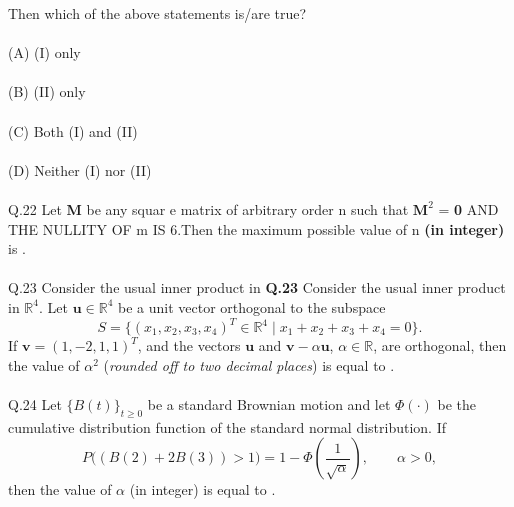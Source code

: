 \documentclass{book}[200pt]
\begin{document}
{Then which of the above statements is/are true?\\
\\
(A) (I) only \\
\\
(B) (II) only \\
\\
(C) Both (I) and (II)\\
\\
(D) Neither (I) nor (II)\\
\\
Q.22 Let \textbf{M} be any squar e matrix of arbitrary order n such that $\textbf{M}^2$  = \textbf{0} AND THE NULLITY OF m IS 6.Then the maximum possible value of n \textbf{(in integer)} is \underline{\hspace{2cm}}.\\
\\
Q.23 Consider the usual inner product in \textbf{Q.23} Consider the usual inner product in $\mathbb{R}^4$. 
Let $\mathbf{u} \in \mathbb{R}^4$ be a unit vector orthogonal to the subspace
\[
S = \{ (x_1, x_2, x_3, x_4)^T \in \mathbb{R}^4 
\mid x_1 + x_2 + x_3 + x_4 = 0 \}.
\]
If $\mathbf{v} = (1, -2, 1, 1)^T$, and the vectors $\mathbf{u}$ and 
$\mathbf{v} - \alpha \mathbf{u}$, $\alpha \in \mathbb{R}$, are orthogonal, 
then the value of $\alpha^2$ (\textit{rounded off to two decimal places}) is equal to 
\underline{\hspace{2cm}}.\\
\\
Q.24 Let $\{ B(t) \}_{t \geq 0}$ be a standard Brownian motion and let 
$\Phi(\cdot)$ be the cumulative distribution function of the standard normal distribution. 
If 
\[
P\big( (B(2) + 2B(3)) > 1 \big)
= 1 - \Phi\left( \frac{1}{\sqrt{\alpha}} \right), 
\qquad \alpha > 0,
\]
then the value of $\alpha$ (in integer) is equal to 
\underline{\hspace{2cm}}.\\
\\
\\

}
\end{document}
